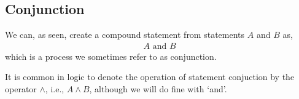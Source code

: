 \subsection{Conjunction}
We can, as seen, create a compound statement from statements $ A $ and $ B $ as,
\begin{align*}
	A \text{ and } B
\end{align*}
which is a process we sometimes refer to as conjunction.

\begin{notation}
	It is common in logic to denote the operation of statement conjuction by the operator $ \land $, i.e., $ A \land B $, although we will do fine with `and'.
\end{notation}

